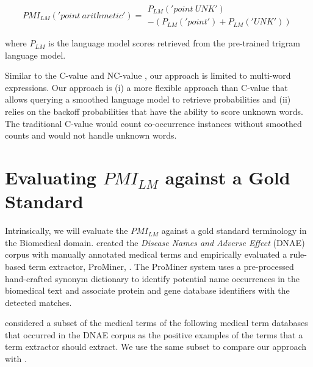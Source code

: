 \begin{equation}
{ PMI }_{ LM }('point \ arithmetic')=
\begin{matrix} 
{ P }_{ LM }('point \ UNK') \\
-({ P }_{ LM }('point')+{ P }_{ LM }('UNK')) 
\end{matrix} 
\end{equation}

where ${ P }_{ LM }$ is the language model scores retrieved from the pre-trained trigram language model.
\fi

Similar to the C-value and NC-value \citep{frantzi1998c}, our approach is limited to multi-word expressions. Our approach is (i) a more flexible approach than C-value that allows querying a smoothed language model to retrieve probabilities and (ii) relies on the backoff probabilities that have the ability to score unknown words. The traditional C-value would count co-occurrence instances without smoothed counts and would not handle unknown words. 


\newpage
\section{Evaluating $PMI_{LM}$ against a Gold Standard}

Intrinsically, we will evaluate the $PMI_{LM}$ against a gold standard terminology in the Biomedical domain. \cite{gurulingappa18empirical} created the \textit{Disease Names and Adverse Effect} (DNAE) corpus with manually annotated medical terms and empirically evaluated a rule-based term extractor, ProMiner, \citep{Hanisch2005}. The ProMiner system uses a pre-processed hand-crafted synonym dictionary to identify potential name occurrences in the biomedical text and associate protein and gene database identifiers with the detected matches. 

\cite{Hanisch2005} considered a subset of the medical terms of the following medical term databases that occurred in the DNAE corpus as the positive examples of the terms that a term extractor should extract. We use the same subset to compare our approach with \cite{Hanisch2005}.

